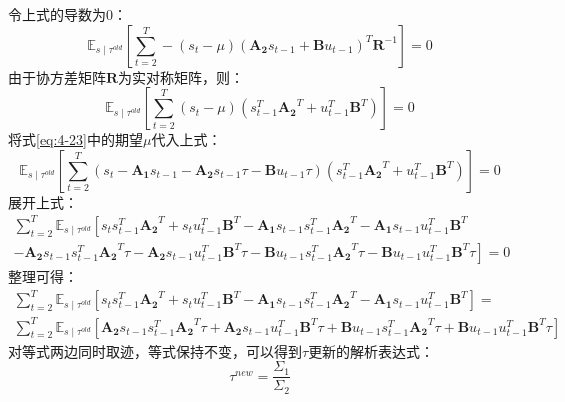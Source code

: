令上式的导数为0：
\begin{equation}
    \mathbb{E}_{s \mid \tau^{old}}\left[\sum_{t=2}^T -\left(s_t-\mu\right)\left(\mathbf{A_2} s_{t-1}+\mathbf{B} u_{t-1}\right)^T\mathbf{R}^{-1}\right] = 0
\end{equation}
由于协方差矩阵$\mathbf{R}$为实对称矩阵，则：
\begin{equation}
    \mathbb{E}_{s \mid \tau^{old}}\left[\sum_{t=2}^T \left(s_t-\mu\right)\left(s_{t-1}^T\mathbf{A_2}^T +u_{t-1}^T\mathbf{B}^T \right)\right] = 0
\end{equation}
将式\ref{eq:4-23}中的期望$\mu$代入上式：
\begin{equation}
    \mathbb{E}_{s \mid \tau^{old}}\left[\sum_{t=2}^T \left(s_t-\mathbf{A_1}s_{t-1}-\mathbf{A_2}s_{t-1}\tau-\mathbf{B}u_{t-1}\tau \right)\left(s_{t-1}^T\mathbf{A_2}^T +u_{t-1}^T\mathbf{B}^T \right)\right] = 0
\end{equation}
展开上式：
\begin{equation}
    \begin{gathered}
    \sum_{t=2}^T \mathbb{E}_{s \mid \tau^{old}}\left[s_ts_{t-1}^T\mathbf{A_2}^T + s_tu_{t-1}^T\mathbf{B}^T -\mathbf{A_1}s_{t-1}s_{t-1}^T\mathbf{A_2}^T - \mathbf{A_1}s_{t-1}u_{t-1}^T\mathbf{B}^T \right. \\ 
    \left. - \mathbf{A_2}s_{t-1}s_{t-1}^T\mathbf{A_2}^T\tau -\mathbf{A_2}s_{t-1}u_{t-1}^T\mathbf{B}^T\tau - \mathbf{B}u_{t-1}s_{t-1}^T\mathbf{A_2}^T\tau - \mathbf{B}u_{t-1}u_{t-1}^T\mathbf{B}^T\tau\right] = 0
    \end{gathered}
\end{equation}
整理可得：
\begin{equation}
    \begin{gathered}
    \sum_{t=2}^T \mathbb{E}_{s \mid \tau^{old}}\left[s_ts_{t-1}^T\mathbf{A_2}^T + s_tu_{t-1}^T\mathbf{B}^T -\mathbf{A_1}s_{t-1}s_{t-1}^T\mathbf{A_2}^T - \mathbf{A_1}s_{t-1}u_{t-1}^T\mathbf{B}^T\right] = \\ 
    \sum_{t=2}^T \mathbb{E}_{s \mid \tau^{old}}\left[\mathbf{A_2}s_{t-1}s_{t-1}^T\mathbf{A_2}^T\tau +\mathbf{A_2}s_{t-1}u_{t-1}^T\mathbf{B}^T\tau + \mathbf{B}u_{t-1}s_{t-1}^T\mathbf{A_2}^T\tau +\mathbf{B}u_{t-1}u_{t-1}^T\mathbf{B}^T\tau\right]
    \end{gathered}
\end{equation}
对等式两边同时取迹，等式保持不变，可以得到$\tau$更新的解析表达式：
\begin{equation}
    \tau^{new} = \frac{\Sigma_1}{\Sigma_2}
\end{equation}
